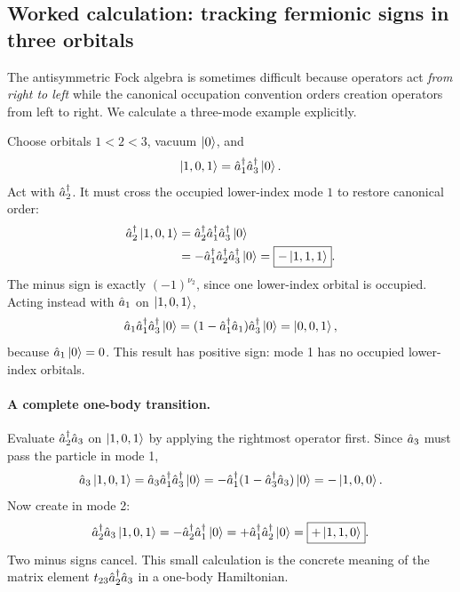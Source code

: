 \subsection*{Worked calculation: tracking fermionic signs in three orbitals}
The antisymmetric Fock algebra is sometimes difficult because
operators act \emph{from right to left} while the canonical
occupation convention orders creation operators from left to right.
We calculate a three-mode example explicitly.

Choose orbitals $1<2<3$, vacuum $\left|0\right\rangle$, and
\begin{equation}
\left|1,0,1\right\rangle=\hat{a}_1^\dagger\hat{a}_3^\dagger\left|0\right\rangle.
\end{equation}
Act with $\hat{a}_2^\dagger$. It must cross the occupied
lower-index mode $1$ to restore canonical order:
\begin{align}
\hat{a}_2^\dagger\left|1,0,1\right\rangle
&=\hat{a}_2^\dagger\hat{a}_1^\dagger\hat{a}_3^\dagger\left|0\right\rangle\notag\\
&=-\hat{a}_1^\dagger\hat{a}_2^\dagger\hat{a}_3^\dagger\left|0\right\rangle
=\boxed{-\left|1,1,1\right\rangle}.
\end{align}
The minus sign is exactly $(-1)^{\nu_2}$, since one
lower-index orbital is occupied. Acting instead with
$\hat{a}_1$ on $\left|1,0,1\right\rangle$,
\begin{equation}
\hat{a}_1\hat{a}_1^\dagger\hat{a}_3^\dagger\left|0\right\rangle
=(1-\hat{a}_1^\dagger\hat{a}_1)\hat{a}_3^\dagger\left|0\right\rangle
=\left|0,0,1\right\rangle,
\end{equation}
because $\hat{a}_1\left|0\right\rangle=0$.
This result has positive sign: mode 1 has no occupied
lower-index orbitals.

\paragraph{A complete one-body transition.}
Evaluate $\hat{a}_2^\dagger\hat{a}_3$ on
$\left|1,0,1\right\rangle$ by applying the rightmost operator first.
Since $\hat{a}_3$ must pass the particle in mode 1,
\begin{equation}
\hat{a}_3\left|1,0,1\right\rangle
=\hat{a}_3\hat{a}_1^\dagger\hat{a}_3^\dagger\left|0\right\rangle
=-\hat{a}_1^\dagger(1-\hat{a}_3^\dagger\hat{a}_3)\left|0\right\rangle
=-\left|1,0,0\right\rangle.
\end{equation}
Now create in mode 2:
\begin{equation}
\hat{a}_2^\dagger\hat{a}_3\left|1,0,1\right\rangle
=-\hat{a}_2^\dagger\hat{a}_1^\dagger\left|0\right\rangle
=+\hat{a}_1^\dagger\hat{a}_2^\dagger\left|0\right\rangle
=\boxed{+\left|1,1,0\right\rangle}.
\end{equation}
Two minus signs cancel. This small calculation is the
concrete meaning of the matrix element
$t_{23}\hat{a}_2^\dagger\hat{a}_3$
in a one-body Hamiltonian.

